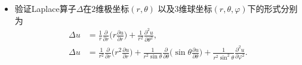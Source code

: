 \begin{itemize}
    \item[1.] 验证Laplace算子$\Delta$在$2$维极坐标$(r, \theta)$
    以及$3$维球坐标$(r, \theta, \varphi)$下的形式分别为
    \begin{align*}
        \Delta u &= \frac{1}{r} \frac{\partial}{\partial r}
        \bigg(r \frac{\partial u}{\partial r}\bigg) 
        + \frac{1}{r^2} \frac{\partial^2 u}{\partial \theta^2},\\
        \Delta u &= \frac{1}{r^2}\frac{\partial}{\partial r}
        \bigg(r^2 \frac{\partial u}{\partial r}\bigg) 
        + \frac{1}{r^2 \sin \theta} \frac{\partial}{\partial \theta}
        \bigg(\!\sin \theta \frac{\partial u}{\partial \theta}\bigg) 
        + \frac{1}{r^2\sin^2 \theta} \frac{\partial^2 u}{\partial \varphi^2}.
    \end{align*}
   

\end{itemize}
